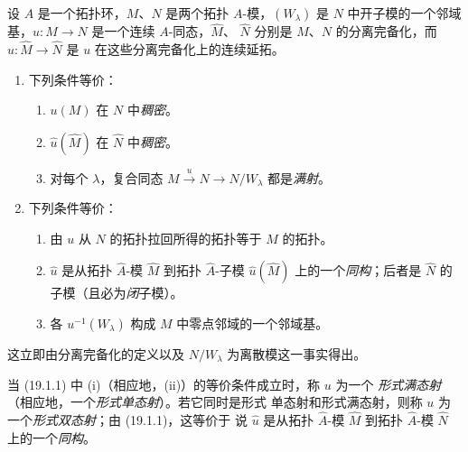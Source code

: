 \begin{proposition}[19.1.1]
\label{0.19.1.1-fr}
设 $A$ 是一个拓扑环，$M$、$N$ 是两个拓扑 $A$-模，$(W_\lambda)$ 是 $N$
中开子模的一个邻域基，$u:M\to N$ 是一个连续 $A$-同态，$\widehat M$、
$\widehat N$ 分别是 $M$、$N$ 的分离完备化，而
$\widehat u:\widehat M\to\widehat N$ 是 $u$ 在这些分离完备化上的连续延拓。
\begin{enumerate}
  \item[(i)] 下列条件等价：
  \begin{enumerate}
    \item[a)] $u(M)$ 在 $N$ 中\emph{稠密}。
    \item[a$'$)] $\widehat u(\widehat M)$ 在 $\widehat N$ 中\emph{稠密}。
    \item[a$''$)] 对每个 $\lambda$，复合同态
    $M\xrightarrow{u}N\to N/W_\lambda$ 都是\emph{满射}。
  \end{enumerate}
  \item[(ii)] 下列条件等价：
  \begin{enumerate}
    \item[b)] 由 $u$ 从 $N$ 的拓扑拉回所得的拓扑等于 $M$ 的拓扑。
    \item[b$'$)] $\widehat u$ 是从拓扑 $\widehat A$-模 $\widehat M$ 到拓扑
    $\widehat A$-子模 $\widehat u(\widehat M)$ 上的一个\emph{同构}；后者是
    $\widehat N$ 的子模（且必为\emph{闭}子模）。
    \item[b$''$)] 各 $u^{-1}(W_\lambda)$ 构成 $M$ 中零点邻域的一个邻域基。
  \end{enumerate}
\end{enumerate}
这立即由分离完备化的定义以及 $N/W_\lambda$ 为离散模这一事实得出。
\end{proposition}

\begin{env}[19.1.2]
\label{0.19.1.2-fr}
当 (19.1.1) 中 (i)（相应地，(ii)）的等价条件成立时，称 $u$ 为一个
\emph{形式满态射}（相应地，一个\emph{形式单态射}）。若它同时是形式
单态射和形式满态射，则称 $u$ 为一个\emph{形式双态射}；由 (19.1.1)，这等价于
说 $\widehat u$ 是从拓扑 $\widehat A$-模 $\widehat M$ 到拓扑
$\widehat A$-模 $\widehat N$ 上的一个\emph{同构}。
\end{env}

